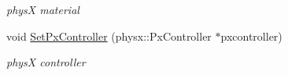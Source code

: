 \begin{DoxyCompactItemize}
\begin{DoxyCompactList}\small\item\em physX material \item\end{DoxyCompactList}\item 
\hypertarget{classContent_1_1Actor_1_1Physics_1_1PhysX_1_1Controller_a4a8a5c4620a1bcb91290811af00c7253}{
void \hyperlink{classContent_1_1Actor_1_1Physics_1_1PhysX_1_1Controller_a4a8a5c4620a1bcb91290811af00c7253}{SetPxController} (physx::PxController $\ast$pxcontroller)}
\label{classContent_1_1Actor_1_1Physics_1_1PhysX_1_1Controller_a4a8a5c4620a1bcb91290811af00c7253}

\begin{DoxyCompactList}\small\item\em physX controller \item\end{DoxyCompactList}\end{DoxyCompactItemize}

